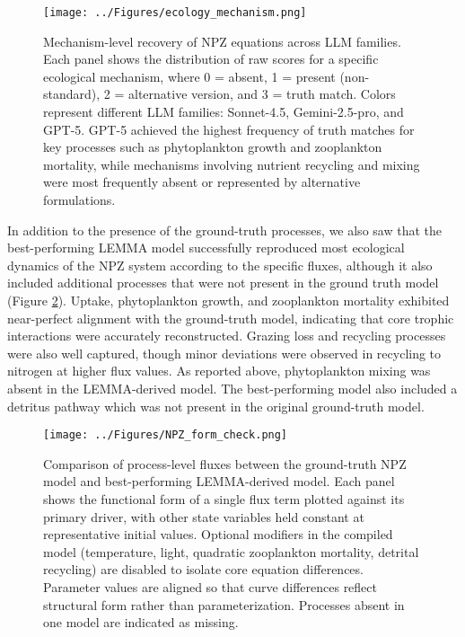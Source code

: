 \begin{figure}[H]
\centering
\texttt{[image: ../Figures/ecology\_mechanism.png]}
\caption{Mechanism-level recovery of NPZ equations across LLM families. Each panel shows the distribution of raw scores for a specific ecological mechanism, where 0 = absent, 1 = present (non-standard), 2 = alternative version, and 3 = truth match. Colors represent different LLM families: Sonnet-4.5, Gemini-2.5-pro, and GPT-5. GPT-5 achieved the highest frequency of truth matches for key processes such as phytoplankton growth and zooplankton mortality, while mechanisms involving nutrient recycling and mixing were most frequently absent or represented by alternative formulations.}
\label{fig:mechanism_recovery}
\end{figure}

In addition to the presence of the ground-truth processes, we also saw that the best-performing LEMMA model successfully reproduced most ecological dynamics of the NPZ system according to the specific fluxes, although it also included additional processes that were not present in the ground truth model (Figure \ref{fig:npz_flux_comparison}). Uptake, phytoplankton growth, and zooplankton mortality exhibited near-perfect alignment with the ground-truth model, indicating that core trophic interactions were accurately reconstructed. Grazing loss and recycling processes were also well captured, though minor deviations were observed in recycling to nitrogen at higher flux values. As reported above, phytoplankton mixing was absent in the LEMMA-derived model. The best-performing model also included a detritus pathway which was not present in the original ground-truth model.

\begin{figure}[H]
\centering
\texttt{[image: ../Figures/NPZ\_form\_check.png]}
\caption{Comparison of process-level fluxes between the ground-truth NPZ model and best-performing LEMMA-derived model. Each panel shows the functional form of a single flux term plotted against its primary driver, with other state variables held constant at representative initial values. Optional modifiers in the compiled model (temperature, light, quadratic zooplankton mortality, detrital recycling) are disabled to isolate core equation differences. Parameter values are aligned so that curve differences reflect structural form rather than parameterization. Processes absent in one model are indicated as missing.}
\label{fig:npz_flux_comparison}
\end{figure}


